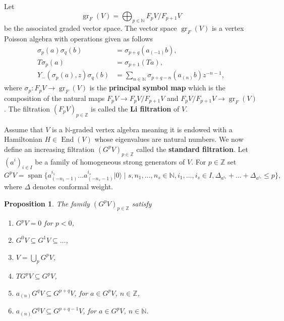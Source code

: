 \documentclass[12pt, a4paper]{article}
\newtheorem{proposition}{Proposition}
\DeclareMathOperator{\gr}{gr}
\DeclareMathOperator{\End}{End}
\DeclareMathOperator{\vspan}{span}
\newcommand{\vac}{|0\rangle}
\begin{document}
Let
\begin{equation*}
  \gr_F(V) = \bigoplus_{p\in \mathbb{N}}F_pV/F_{p + 1}V
\end{equation*}
be the associated graded vector space.
The vector space $\gr_F(V)$ is a vertex Poisson algebra with operations given as follows
\begin{align*}
  \sigma_p(a)\sigma_q(b) &= \sigma_{p + q}(a_{(-1)}b), \\
  T\sigma_p(a) &= \sigma_{p + 1}(Ta), \\
  Y_-(\sigma_p(a),z)\sigma_q(b) &= \sum_{n \in \mathbb{N}}\sigma_{p + q - n}(a_{(n)}b)z^{-n - 1},
\end{align*}
where $\sigma_p: F_pV \to \gr_F(V)$ is the \textbf{principal symbol map} which is the composition of the natural maps $F_pV \to F_pV/F_{p + 1}V$ and $F_pV/F_{p+1}V \to \gr_F(V)$.
The filtration $(F_pV)_{p\in \mathbb{Z}}$ is called the \textbf{Li filtration} of $V$.

Assume that $V$ is a $\mathbb{N}$-graded vertex algebra meaning it is endowed with a Hamiltonian $H \in \End(V)$ whose eigenvalues are natural numbers.
We now define an increasing filtration $(G^pV)_{p \in \mathbb{Z}}$ called the \textbf{standard filtration}.
Let $(a^i)_{i \in I}$ be a family of homogeneous strong generators of $V$.
For $p \in \mathbb{Z}$ set
\begin{equation*}
  G^pV = \vspan\{a^{i_1}_{(-n_1 - 1)}\dots a^{i_s}_{(-n_s - 1)}\vac \mid s, n_1, \dots, n_s \in \mathbb{N}, i_1, \dots, i_s \in I, \Delta_{a^{i_1}} + \dots + \Delta_{a^{i_s}} \le p\},
\end{equation*}
where $\Delta$ denotes conformal weight.

\begin{proposition}
  \label{prp:2}
  The family $(G^pV)_{p\in \mathbb{Z}}$ satisfy
  \begin{enumerate}[label={(\alph*)}]
  \item $G^pV = 0$ for $p < 0$,
  \item $G^0V \subseteq G^1V \subseteq \dots$,
  \item $V = \bigcup_pG^pV$,
  \item $TG^pV \subseteq G^pV$,
  \item $a_{(n)}G^qV \subseteq G^{p + q}V$, for $a \in G^pV$, $n \in \mathbb{Z}$,
  \item $a_{(n)}G^qV \subseteq G^{p + q - 1}V$, for $a \in G^pV$, $n \in \mathbb{N}$.
  \end{enumerate}
\end{proposition}
\end{document}
